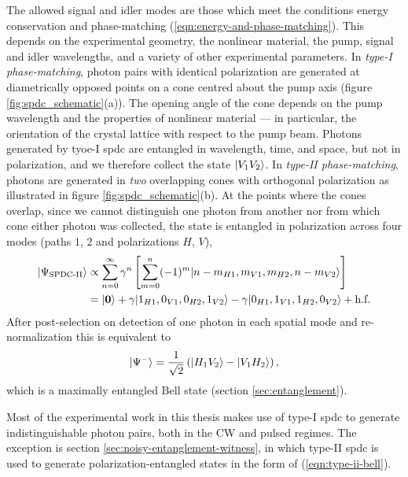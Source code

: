 The allowed signal and idler modes are those which meet the conditions energy conservation and phase-matching (\ref{eqn:energy-and-phase-matching}).  This depends on the experimental geometry, the nonlinear material, the pump, signal and idler wavelengths, and a variety of other experimental parameters. In \emph{type-I phase-matching}, photon pairs with identical polarization are generated at diametrically opposed points on a cone centred about the pump axis (figure \ref{fig:spdc_schematic}(a)). The opening angle of the cone depends on the pump wavelength and the properties of nonlinear material --- in particular, the orientation of the crystal lattice with respect to the pump beam. Photons generated by tyoe-I \gls{spdc} are entangled in wavelength, time, and space, but not in polarization, and we therefore collect the state $\mbox{$ | V_1V_2 \rangle $}$. In \emph{type-II phase-matching}, photons are generated in \emph{two} overlapping cones with orthogonal polarization \cite{Kwiat1995} 
as illustrated in figure \ref{fig:spdc_schematic}(b). At the points where the cones overlap, since we cannot distinguish one photon from another nor from which cone either photon was collected, the state is entangled in polarization across four modes (paths $1$, $2$ and polarizations $H$, $V$),
\begin{align}
    \mbox{$ | \Psi_\text{SPDC-II} \rangle $} 
    &\propto  
    \sum_{n=0}^\infty 
    \gamma^n
    \left[ \sum_{m=0}^n 
        (-1)^m
        \mbox{$ | n-m_{H1}, m_{V1}, m_{H2}, n-m_{V2} \rangle $}
    \right]\\
    &=
        \mbox{$ | \mathbf{0} \rangle $}
        + \gamma \mbox{$ | 1_{H1}, 0_{V1}, 0_{H2}, 1_{V2} \rangle $}
        - \gamma \mbox{$ | 0_{H1}, 1_{V1}, 1_{H2}, 0_{V2} \rangle $} + \text{h.f.}
\end{align}
After post-selection on detection of one photon in each spatial mode and re-normalization this is equivalent to
\begin{equation}
    \mbox{$ | \Psi^- \rangle $} = \frac{1}{\sqrt{2}}\left(\mbox{$ | H_1V_2 \rangle $} - \mbox{$ | V_1H_2 \rangle $}\right),
    \label{eqn:type-ii-bell}
\end{equation}
which is a maximally entangled Bell state (section \ref{sec:entanglement}).

Most of the experimental work in this thesis makes use of type-I \gls{spdc} to generate indistinguishable photon pairs, both in the CW and pulsed regimes. The exception is section \ref{sec:noisy-entanglement-witness}, in which type-II \gls{spdc} is used to generate polarization-entangled states in the form of (\ref{eqn:type-ii-bell}).

